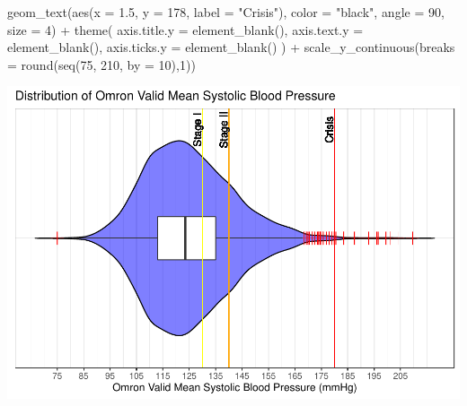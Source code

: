 \documentclass[
  11pt,
]{article}
\newenvironment{Shaded}{\begin{snugshade}}{\end{snugshade}}
\newcommand{\AttributeTok}[1]{\textcolor[rgb]{0.77,0.63,0.00}{#1}}
\newcommand{\DecValTok}[1]{\textcolor[rgb]{0.00,0.00,0.81}{#1}}
\newcommand{\FloatTok}[1]{\textcolor[rgb]{0.00,0.00,0.81}{#1}}
\newcommand{\FunctionTok}[1]{\textcolor[rgb]{0.00,0.00,0.00}{#1}}
\newcommand{\NormalTok}[1]{#1}
\newcommand{\SpecialCharTok}[1]{\textcolor[rgb]{0.00,0.00,0.00}{#1}}
\newcommand{\StringTok}[1]{\textcolor[rgb]{0.31,0.60,0.02}{#1}}
\begin{document}
\begin{Shaded}
\begin{Highlighting}[]
  \FunctionTok{geom\_text}\NormalTok{(}\FunctionTok{aes}\NormalTok{(}\AttributeTok{x =} \FloatTok{1.5}\NormalTok{, }\AttributeTok{y =} \DecValTok{178}\NormalTok{, }\AttributeTok{label =} \StringTok{"Crisis"}\NormalTok{), }\AttributeTok{color =} \StringTok{"black"}\NormalTok{, }\AttributeTok{angle =} \DecValTok{90}\NormalTok{, }\AttributeTok{size =} \DecValTok{4}\NormalTok{) }\SpecialCharTok{+}
  \FunctionTok{theme}\NormalTok{(}
    \AttributeTok{axis.title.y =} \FunctionTok{element\_blank}\NormalTok{(),}
    \AttributeTok{axis.text.y =} \FunctionTok{element\_blank}\NormalTok{(),}
    \AttributeTok{axis.ticks.y =} \FunctionTok{element\_blank}\NormalTok{()}
\NormalTok{  ) }\SpecialCharTok{+}
  \FunctionTok{scale\_y\_continuous}\NormalTok{(}\AttributeTok{breaks =} \FunctionTok{round}\NormalTok{(}\FunctionTok{seq}\NormalTok{(}\DecValTok{75}\NormalTok{, }\DecValTok{210}\NormalTok{, }\AttributeTok{by =} \DecValTok{10}\NormalTok{),}\DecValTok{1}\NormalTok{))}
\end{Highlighting}
\end{Shaded}

\includegraphics{figs/Outliers.pdf}
\end{document}
